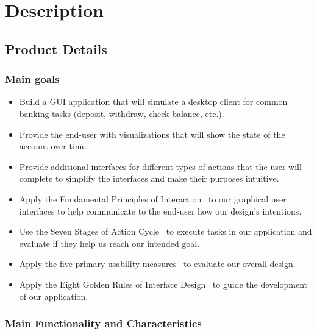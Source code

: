 \section{Description}
\label{sect:description}

\subsection{Product Details}
\label{sect:product_details}

\subsubsection{Main goals}
\label{sect:main_goals}

\begin{itemize}[itemsep=0.5mm, parsep=0pt]
    \item {Build a GUI application that will simulate a desktop client for common banking tasks (deposit, withdraw, check balance, etc.).}
    \item {Provide the end-user with visualizations that will show the state of the account over time.}
    \item {Provide additional interfaces for different types of actions that the user will complete to simplify the interfaces and make their purposes intuitive.}
    \item {Apply the Fundamental Principles of Interaction~\cite{THE_DESIGN_OF_EVERYDAY_THINGS:1} to our graphical user interfaces to help communicate to the end-user how our design's intentions.}
    \item {Use the Seven Stages of Action Cycle~\cite{THE_DESIGN_OF_EVERYDAY_THINGS:1} to execute tasks in our application and evaluate if they help us reach our intended goal.}
    \item {Apply the five primary usability measures~\cite{DESIGNING_THE_USER_INTERFACE:2} to evaluate our overall design.}
    \item {Apply the Eight Golden Rules of Interface Design~\cite{DESIGNING_THE_USER_INTERFACE:2} to guide the development of our application.}
\end{itemize}

\newpage

\subsubsection{Main Functionality and Characteristics}
\label{sect:main_func}

